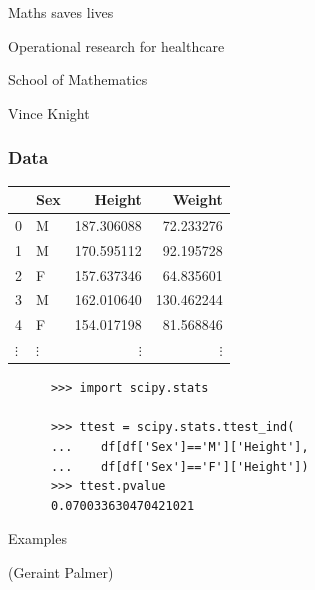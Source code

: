 \documentclass{beamer}
\begin{document}
    \begin{frame}
        \begin{center}
            \Huge

            Maths saves lives 

            \Large
            Operational research for healthcare

            \vspace{1cm}

            School of Mathematics

            \normalsize
            Vince Knight
        \end{center}
    \end{frame}

    \begin{frame}[fragile]
        \frametitle{Data}
        \begin{center}
            \begin{tabular}{llrr}
                \toprule
                & Sex & Height & Weight \\
                \midrule
                0 & M & 187.306088 & 72.233276 \\
                1 & M & 170.595112 & 92.195728 \\
                2 & F & 157.637346 & 64.835601 \\
                3 & M & 162.010640 & 130.462244 \\
                4 & F & 154.017198 & 81.568846 \\
                $\vdots$ & $\vdots$ & $\vdots$ & $\vdots$ \\
                \bottomrule
            \end{tabular}
            \vspace{1cm}
            \pause
            \small{
                \begin{verbatim}
      >>> import scipy.stats

      >>> ttest = scipy.stats.ttest_ind(
      ...    df[df['Sex']=='M']['Height'],
      ...    df[df['Sex']=='F']['Height'])
      >>> ttest.pvalue
      0.070033630470421021
                \end{verbatim}
            }
        \end{center}
\end{frame}

    \begin{frame}
        \begin{center}
            \Huge
            Examples

			\normalsize
			(Geraint Palmer)
        \end{center}
    \end{frame}
\end{document}
